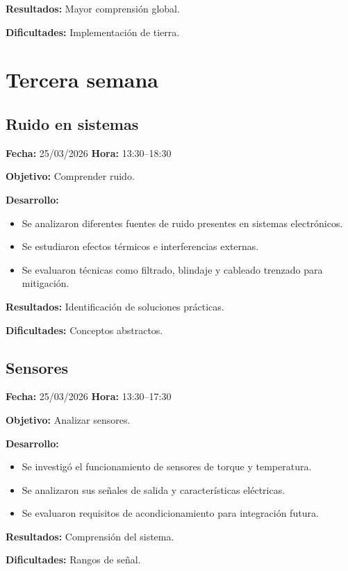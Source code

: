 \documentclass[12pt]{article}
\begin{document}
\textbf{Resultados:}
Mayor comprensión global.

\textbf{Dificultades:}
Implementación de tierra.

\section{Tercera semana}

\subsection{Ruido en sistemas}
\textbf{Fecha:} 25/03/2026 \quad \textbf{Hora:} 13:30--18:30

\textbf{Objetivo:}
Comprender ruido.

\textbf{Desarrollo:}
\begin{itemize}
\item Se analizaron diferentes fuentes de ruido presentes en sistemas electrónicos.
\item Se estudiaron efectos térmicos e interferencias externas.
\item Se evaluaron técnicas como filtrado, blindaje y cableado trenzado para mitigación.
\end{itemize}

\textbf{Resultados:}
Identificación de soluciones prácticas.

\textbf{Dificultades:}
Conceptos abstractos.

\subsection{Sensores}
\textbf{Fecha:} 25/03/2026 \quad \textbf{Hora:} 13:30--17:30

\textbf{Objetivo:}
Analizar sensores.

\textbf{Desarrollo:}
\begin{itemize}
\item Se investigó el funcionamiento de sensores de torque y temperatura.
\item Se analizaron sus señales de salida y características eléctricas.
\item Se evaluaron requisitos de acondicionamiento para integración futura.
\end{itemize}

\textbf{Resultados:}
Comprensión del sistema.

\textbf{Dificultades:}
Rangos de señal.

\end{document}
